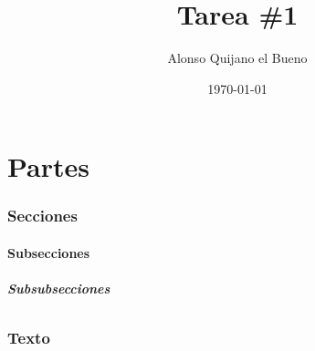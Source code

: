\documentclass[theorems,spanish,code]{HomeWork}
\institute{Escuela de Ciencias Físicas y Matemáticas}
\title{Tarea \#1}
\author{Alonso Quijano el Bueno}
\date{\today}
\begin{document}
\maketitle

\part{Partes}
\section{Secciones}
\subsection{Subsecciones}
\subsubsection{Subsubsecciones}
\paragraph{\kant[1]}

\section{Texto}
\kant[2-3]
\end{document}
